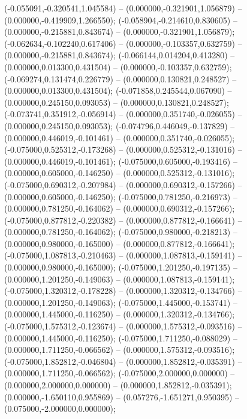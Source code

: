  (-0.055091,-0.320541,1.045584) -- (0.000000,-0.321901,1.056879) -- (0.000000,-0.419909,1.266550);
 (-0.058904,-0.214610,0.830605) -- (0.000000,-0.215881,0.843674) -- (0.000000,-0.321901,1.056879);
 (-0.062634,-0.102240,0.617406) -- (0.000000,-0.103357,0.632759) -- (0.000000,-0.215881,0.843674);
 (-0.066144,0.014204,0.413280) -- (0.000000,0.013300,0.431504) -- (0.000000,-0.103357,0.632759);
 (-0.069274,0.131474,0.226779) -- (0.000000,0.130821,0.248527) -- (0.000000,0.013300,0.431504);
 (-0.071858,0.245544,0.067090) -- (0.000000,0.245150,0.093053) -- (0.000000,0.130821,0.248527);
 (-0.073741,0.351912,-0.056914) -- (0.000000,0.351740,-0.026055) -- (0.000000,0.245150,0.093053);
 (-0.074796,0.446049,-0.137829) -- (0.000000,0.446019,-0.101461) -- (0.000000,0.351740,-0.026055);
 (-0.075000,0.525312,-0.173268) -- (0.000000,0.525312,-0.131016) -- (0.000000,0.446019,-0.101461);
 (-0.075000,0.605000,-0.193416) -- (0.000000,0.605000,-0.146250) -- (0.000000,0.525312,-0.131016);
 (-0.075000,0.690312,-0.207984) -- (0.000000,0.690312,-0.157266) -- (0.000000,0.605000,-0.146250);
 (-0.075000,0.781250,-0.216973) -- (0.000000,0.781250,-0.164062) -- (0.000000,0.690312,-0.157266);
 (-0.075000,0.877812,-0.220382) -- (0.000000,0.877812,-0.166641) -- (0.000000,0.781250,-0.164062);
 (-0.075000,0.980000,-0.218213) -- (0.000000,0.980000,-0.165000) -- (0.000000,0.877812,-0.166641);
 (-0.075000,1.087813,-0.210463) -- (0.000000,1.087813,-0.159141) -- (0.000000,0.980000,-0.165000);
 (-0.075000,1.201250,-0.197135) -- (0.000000,1.201250,-0.149063) -- (0.000000,1.087813,-0.159141);
 (-0.075000,1.320312,-0.178228) -- (0.000000,1.320312,-0.134766) -- (0.000000,1.201250,-0.149063);
 (-0.075000,1.445000,-0.153741) -- (0.000000,1.445000,-0.116250) -- (0.000000,1.320312,-0.134766);
 (-0.075000,1.575312,-0.123674) -- (0.000000,1.575312,-0.093516) -- (0.000000,1.445000,-0.116250);
 (-0.075000,1.711250,-0.088029) -- (0.000000,1.711250,-0.066562) -- (0.000000,1.575312,-0.093516);
 (-0.075000,1.852812,-0.046804) -- (0.000000,1.852812,-0.035391) -- (0.000000,1.711250,-0.066562);
 (-0.075000,2.000000,0.000000) -- (0.000000,2.000000,0.000000) -- (0.000000,1.852812,-0.035391);
 (0.000000,-1.650110,0.955869) -- (0.057276,-1.651271,0.950395) -- (0.075000,-2.000000,0.000000);

